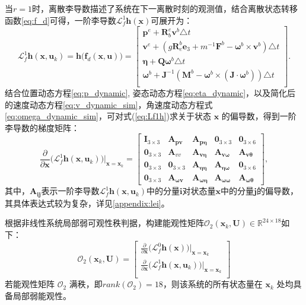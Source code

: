 当$r=1$时，离散李导数描述了系统在下一离散时刻的观测值，结合离散状态转移函数\ref{eq:f_d}可得，一阶李导数$\mathcal{L}_f^1 \bm{h}(\bm{x})$可展开为：
\begin{equation}
    \mathcal{L}_f^1 \bm{h}(\bm{x}, \bm{u}_k) = 
    \bm{h}\big(\bm{f}_d(\bm{x},\bm{u})\big) =
    \begin{bmatrix}
        \bm{p}^e + \bm{R}_b^e \bm{v}^b \triangle t \\
        \bm{v}^e + (g\bm{R}_e^b \bm{e}_{3} +  m^{-1}\bm{F}^b - \bm{\omega}^b \times \bm{v}^b) \triangle t\\
        \bm{\eta} + \bm{Q}\bm{\omega}^b \triangle t \\
        \bm{\omega}^b + \bm{J}^{-1}(\bm{M}^b - \bm{\omega}^b\times(\bm{J}\cdot\bm{\omega}^b)) \triangle t \\
    \end{bmatrix}.
    \label{eq:Lf1h}
\end{equation}
结合位置动态方程\ref{eq:p_dynamic}, 姿态动态方程\ref{eq:eta_dynamic}，以及简化后的速度动态方程\ref{eq:v_dynamic_sim}，角速度动态方程式\eqref{eq:omega_dynamic_sim}，可对式(\ref{eq:Lf1h})求关于状态 $\bm{x}$ 的偏导数，得到一阶李导数的梯度矩阵：
\begin{equation}
    \frac{\partial}{\partial \bm{x}}\big( \mathcal{L}_f^1 \bm{h}(\bm{x}, \bm{u}_k) \big)\Big|_{\bm{x}=\bm{x}_k} = 
    \begin{bmatrix}
        \bm{I}_{3 \times 3} & \bm{A}_{\bm{p} \bm{v}} & \bm{A}_{\bm{p} \bm{\eta}} & \bm{0}_{3 \times 3} & \bm{0}_{3 \times 6} \\
        \bm{0}_{3 \times 3} & \bm{A}_{v v} & \bm{A}_{\bm{v \eta}} & \bm{A}_{\bm{v \omega}} & \bm{A}_{\bm{v \theta}} \\
        \bm{0}_{3 \times 3} & \bm{0}_{3 \times 3} & \bm{A}_{\bm{\eta \eta}} & \bm{A}_{\bm{\eta \omega}} & \bm{0}_{3 \times 6} \\
        \bm{0}_{3 \times 3} & \bm{A}_{\bm{\omega v}} & \bm{A}_{\bm{\omega \eta}} & \bm{A}_{\bm{\omega \omega}} & \bm{A}_{\bm{\omega \theta}}
    \end{bmatrix},
    \label{eq:lei_sim}
\end{equation}
其中，$\bm{A}_{\bm{ij}}$表示一阶李导数$\mathcal{L}_f^1 \bm{h}(\bm{x}, \bm{u}_k)$中的分量$\bm{i}$对状态量$\bm{x}$中的分量$\bm{j}$的偏导数，其具体表达式较为复杂，详见\ref{appendix:lei}。

根据非线性系统局部弱可观性秩判据，构建能观性矩阵$\mathcal{O}_2(\bm{x}_k, \bm{U}) \in \mathbb{R}^{24 \times 18}$如下：
\begin{equation}
    \mathcal{O}_2(\bm{x}_k, \bm{U}) = 
    \begin{bmatrix}
        \frac{\partial}{\partial \bm{x}}\big( \mathcal{L}_f^0 \bm{h}(\bm{x}) \big)\Big|_{\bm{x}=\bm{x}_k} \\[10pt]
        \frac{\partial}{\partial \bm{x}}\big( \mathcal{L}_f^1 \bm{h}(\bm{x}, \bm{u}_k) \big)\Big|_{\bm{x}=\bm{x}_k} \\[10pt]
    \end{bmatrix}
\end{equation}
若能观性矩阵 $\mathcal{O}_2$ 满秩，即$rank(\mathcal{O}_2) = 18$，则该系统的所有状态量在 $\bm{x}_k$ 处均具备局部弱能观性。

